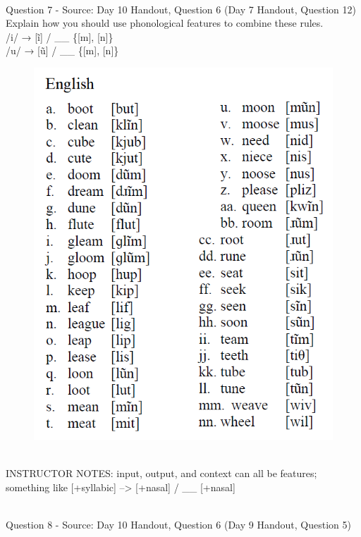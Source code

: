 \documentclass[12pt]{article}
\begin{document}
~\\

{\large Question 7} - Source: Day 10 Handout, Question 6 (Day 7 Handout, Question 12)\\

Explain how you should use phonological features to combine these rules.\\

/i/ → {[ĩ]} / \_\_ \{{[m]}, {[n]}\}\\/u/ → {[ũ]} / \_\_ \{{[m]}, {[n]}\}

\begin{figure}[H]
\includegraphics{../images/english_nasalization.png}
\end{figure}

~\\
INSTRUCTOR NOTES: input, output, and context can all be features; something like [+syllabic] --> [+nasal] / \_\_ [+nasal]


~\\

{\large Question 8} - Source: Day 10 Handout, Question 6 (Day 9 Handout, Question 5)\\
\end{document}
